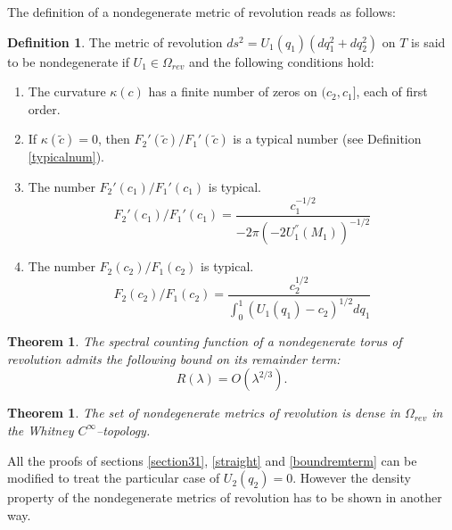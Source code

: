 \documentclass[12pt]{amsart}
\numberwithin{equation}{subsection}
\theoremstyle{definition}
\newtheorem{definition}[equation]{Definition}
\theoremstyle{plain}
\newtheorem{theorem}[equation]{Theorem}
\begin{document}
The definition of a nondegenerate metric of revolution reads as follows:

\begin{definition}
\label{genericity4}
The metric of revolution $ds^2=U_1(q_1)(dq_1^2 + dq_2^2)$ on $T$ is said to be nondegenerate if $U_1 \in \Omega_{rev}$
and the following conditions hold:
\begin{enumerate}
\item The curvature $\kappa(c)$ has a finite number of zeros on $(c_2,c_1]$, each of first order.
\item If $\kappa(\tilde{c})=0$, then ${F_2}'(\tilde{c})/{F_1}'(\tilde{c})$ is a typical number (see Definition \ref{typicalnum}).
\item The number ${F_2}' (c_1) / {F_1}' (c_1)$ is typical.
\[
{F_2}' (c_1) / {F_1}' (c_1) = \frac{  c_1^{-1/2} }
{-2\pi (-2U_{1}^{''}(M_1))^{-1/2}}
\]
\item The number $F_2 (c_2) / F_1 (c_2)$ is typical.
\[
F_2 (c_2) / F_1 (c_2) = \frac{  c_2^{1/2} }
{ \int_{0}^1 (U_1(q_1) - c_2)^{1/2} dq_1}
\]
\end{enumerate}
\end{definition}

\begin{theorem}
\label{thm14} The spectral counting function of a nondegenerate torus of revolution admits the following bound on its remainder term:
\[
R(\lambda) = O(\lambda^{2/3}).
\]
\end{theorem}

\begin{theorem}
\label{thm24} The set of nondegenerate metrics of revolution is dense in $\Omega_{rev}$ in the Whitney $C^{\infty}$--topology.
\end{theorem}

All the proofs of sections \ref{section31}, \ref{straight} and \ref{boundremterm} can be modified to treat the particular case of $U_2(q_2)=0$.
However the density property of the nondegenerate metrics of revolution has to be shown in another way.
\end{document}
